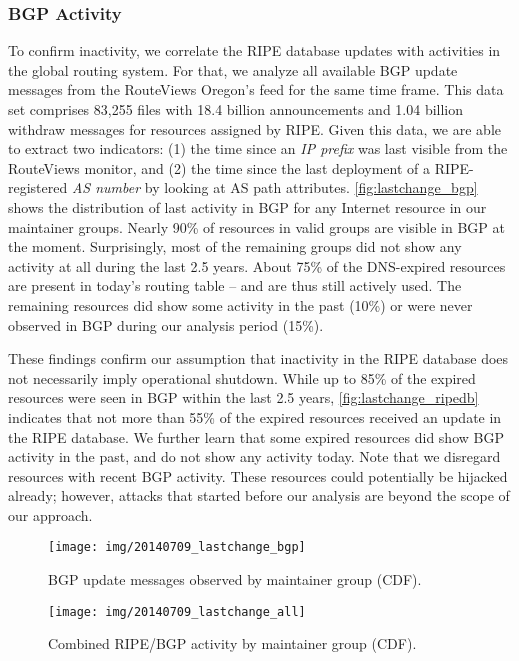 \documentclass{llncs}
\let\orgautoref\autoref
\renewcommand{\autoref}
{\def\sectionautorefname{Section}\orgautoref}
\begin{document}
\subsubsection{BGP Activity}
To confirm inactivity, we correlate the RIPE database updates with activities in the global routing system. For that, we analyze all available BGP update messages from the RouteViews Oregon's feed for the same time frame. This data set comprises 83,255 files with 18.4 billion announcements and 1.04 billion withdraw messages for resources assigned by RIPE. Given this data, we are able to extract two indicators: (1) the time since an \emph{IP prefix} was last visible from the RouteViews monitor, and (2) the time since the last deployment of a RIPE-registered \emph{AS number} by looking at AS path attributes. \autoref{fig:lastchange_bgp} shows the distribution of last activity in BGP for any Internet resource in our maintainer groups. Nearly 90\% of resources in valid groups are visible in BGP at the moment. Surprisingly, most of the remaining groups did not show any activity at all during the last 2.5 years. About 75\% of the DNS-expired resources are present in today's routing table -- and are thus still actively used. The remaining resources did show some activity in the past (10\%) or were never observed in BGP during our analysis period (15\%).

These findings confirm our assumption that inactivity in the RIPE database does not necessarily imply operational shutdown. While up to 85\% of the expired resources were seen in BGP within the last 2.5 years, \autoref{fig:lastchange_ripedb} indicates that not more than 55\% of the expired resources received an update in the RIPE database. We further learn that some expired resources did show BGP activity in the past, and do not show any activity today.
Note that we disregard resources with recent BGP activity. These resources could potentially be hijacked already; however, attacks that started before our analysis are beyond the scope of our approach.

\begin{figure}[!t] \centering
\texttt{[image: img/20140709\_lastchange\_bgp]}
\vspace{-10pt}
\caption{BGP update messages observed by maintainer group (CDF).}
\label{fig:lastchange_bgp}
\end{figure}

\begin{figure}[!t] \centering
\texttt{[image: img/20140709\_lastchange\_all]}
\vspace{-10pt}
\caption{Combined RIPE/BGP activity by maintainer group (CDF).}
\label{fig:lastchange_all}
\end{figure}
\end{document}
